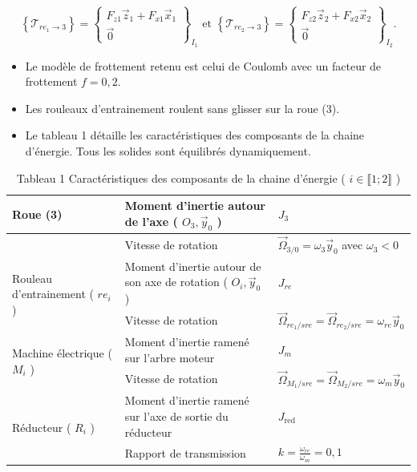 \documentclass[10pt]{article}
\begin{document}
$$
\left\{\mathcal{T}_{r e_{1} \rightarrow 3}\right\}=\left\{\begin{array}{c}
F_{z 1} \vec{z}_{1}+F_{x 1} \vec{x}_{1} \\
\overrightarrow{0}
\end{array}\right\}_{I_{1}} \text { et }\left\{\mathcal{T}_{r e_{2} \rightarrow 3}\right\}=\left\{\begin{array}{c}
F_{z 2} \vec{z}_{2}+F_{x 2} \vec{x}_{2} \\
\overrightarrow{0}
\end{array}\right\}_{I_{2}} .
$$

\begin{itemize}
  \item Le modèle de frottement retenu est celui de Coulomb avec un facteur de frottement $f=0,2$.
  \item Les rouleaux d'entrainement roulent sans glisser sur la roue (3).
  \item Le tableau 1 détaille les caractéristiques des composants de la chaine d'énergie. Tous les solides sont équilibrés dynamiquement.
\end{itemize}

\begin{table}[h]
\begin{center}
\begin{tabular}{|l|l|l|}
\hline
\multirow{2}{*}{Roue (3)} & Moment d'inertie autour de l'axe ( $O_{3}, \vec{y}_{0}$ ) & $J_{3}$ \\
\hline
 & Vitesse de rotation & $\vec{\Omega}_{3 / 0}=\omega_{3} \vec{y}_{0}$ avec $\omega_{3}<0$ \\
\hline
\multirow{2}{*}{Rouleau d'entrainement ( $r e_{i}$ )} & Moment d'inertie autour de son axe de rotation ( $O_{i}, \vec{y}_{0}$ ) & $J_{r e}$ \\
\hline
 & Vitesse de rotation & $\vec{\Omega}_{r e_{1} / s r e}=\vec{\Omega}_{r e_{2} / s r e}=\omega_{r e} \vec{y}_{0}$ \\
\hline
\multirow{2}{*}{Machine électrique ( $M_{i}$ )} & Moment d'inertie ramené sur l'arbre moteur & $J_{m}$ \\
\hline
 & Vitesse de rotation & $\vec{\Omega}_{M_{1} / s r e}=\vec{\Omega}_{M_{2} / s r e}=\omega_{m} \vec{y}_{0}$ \\
\hline
\multirow{2}{*}{Réducteur ( $R_{i}$ )} & Moment d'inertie ramené sur l'axe de sortie du réducteur & $J_{\text {red }}$ \\
\hline
 & Rapport de transmission & $k=\frac{\omega_{r e}}{\omega_{m}}=0,1$ \\
\hline
\end{tabular}
\captionsetup{labelformat=empty}
\caption{Tableau 1 Caractéristiques des composants de la chaine d'énergie ( $i \in \llbracket 1 ; 2 \rrbracket$ )}
\end{center}
\end{table}
\end{document}
